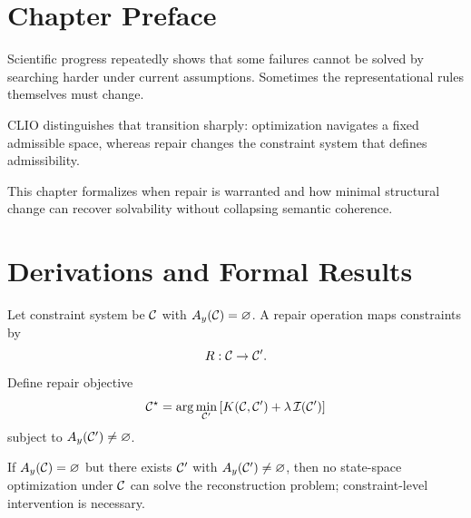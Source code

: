 \section{Chapter Preface}
Scientific progress repeatedly shows that some failures cannot be solved by searching harder under current assumptions. Sometimes the representational rules themselves must change.

CLIO distinguishes that transition sharply: optimization navigates a fixed admissible space, whereas repair changes the constraint system that defines admissibility.

This chapter formalizes when repair is warranted and how minimal structural change can recover solvability without collapsing semantic coherence.

\section{Derivations and Formal Results}
Let constraint system be \(\mathcal{C}\) with \(A_y(\mathcal{C})=\varnothing\). A repair operation maps constraints by
\[
R:\mathcal{C}\to\mathcal{C}'.
\]
Define repair objective
\[
\mathcal{C}^\star=\arg\min_{\mathcal{C}'}\left[K(\mathcal{C},\mathcal{C}')+\lambda\,\mathcal I(\mathcal{C}')\right]
\]
subject to \(A_y(\mathcal{C}')\neq\varnothing\).

\begin{theorem}
If \(A_y(\mathcal{C})=\varnothing\) but there exists \(\mathcal{C}'\) with \(A_y(\mathcal{C}')\neq\varnothing\), then no state-space optimization under \(\mathcal{C}\) can solve the reconstruction problem; constraint-level intervention is necessary.
\end{theorem}
